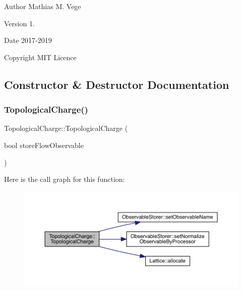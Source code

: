 \begin{DoxyAuthor}{Author}
Mathias M. Vege 
\end{DoxyAuthor}
\begin{DoxyVersion}{Version}
1. 
\end{DoxyVersion}
\begin{DoxyDate}{Date}
2017-\/2019 
\end{DoxyDate}
\begin{DoxyCopyright}{Copyright}
M\+IT Licence 
\end{DoxyCopyright}


\subsection{Constructor \& Destructor Documentation}
\mbox{\label{class_topological_charge_a415e32f865f7b5c83f4ac4471838d514}} 
\subsubsection{\texorpdfstring{TopologicalCharge()}{TopologicalCharge()}}
{\footnotesize\ttfamily Topological\+Charge\+::\+Topological\+Charge (\begin{DoxyParamCaption}\item[{bool}]{store\+Flow\+Observable }\end{DoxyParamCaption})}

Here is the call graph for this function\+:
\nopagebreak
\begin{figure}[H]
\begin{center}
\leavevmode
\includegraphics[width=350pt]{class_topological_charge_a415e32f865f7b5c83f4ac4471838d514_cgraph}
\end{center}
\end{figure}
\mbox{\label{class_topological_charge_aec647c5c45f8532639cebcac10865f2e}} 
